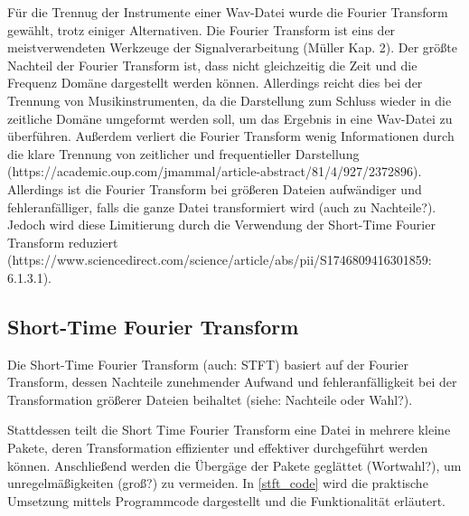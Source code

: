 Für die Trennug der Instrumente einer Wav-Datei wurde die Fourier Transform gewählt, trotz einiger Alternativen. Die Fourier Transform ist eins der meistverwendeten Werkzeuge der Signalverarbeitung (Müller Kap. 2). Der größte Nachteil der Fourier Transform ist, dass nicht gleichzeitig die Zeit und die Frequenz Domäne dargestellt werden können. Allerdings reicht dies bei der Trennung von Musikinstrumenten, da die Darstellung zum Schluss wieder in die zeitliche Domäne umgeformt werden soll, um das Ergebnis in eine Wav-Datei zu überführen. Außerdem verliert die Fourier Transform wenig Informationen durch die klare Trennung von zeitlicher und frequentieller Darstellung (https://academic.oup.com/jmammal/article-abstract/81/4/927/2372896). Allerdings ist die Fourier Transform bei größeren Dateien aufwändiger und fehleranfälliger, falls die ganze Datei transformiert wird (auch zu Nachteile?). Jedoch wird diese Limitierung durch die Verwendung der Short-Time Fourier Transform reduziert (https://www.sciencedirect.com/science/article/abs/pii/S1746809416301859: 6.1.3.1).

%
\subsection{Short-Time Fourier Transform}
%

Die Short-Time Fourier Transform (auch: STFT) basiert auf der Fourier Transform, dessen Nachteile zunehmender Aufwand und fehleranfälligkeit bei der Transformation größerer Dateien beihaltet (siehe: Nachteile oder Wahl?).

\par

Stattdessen teilt die Short Time Fourier Transform eine Datei in mehrere kleine Pakete, deren Transformation effizienter und effektiver durchgeführt werden können. Anschließend werden die Übergäge der Pakete geglättet (Wortwahl?), um unregelmäßigkeiten (groß?) zu vermeiden. In \cref{stft_code} wird die praktische Umsetzung mittels Programmcode dargestellt und die Funktionalität erläutert.